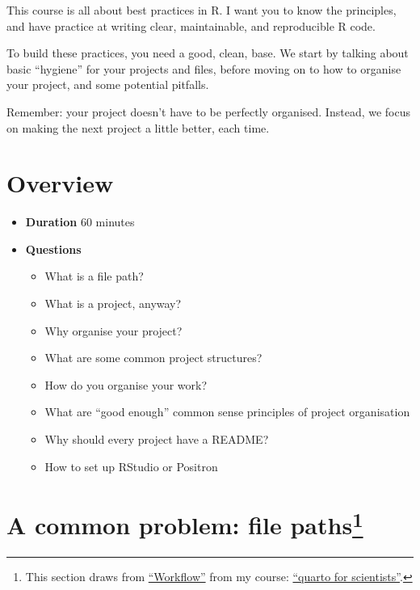 \documentclass[
  letterpaper,
  justified,
  a4paper]{tufte-book}
\providecommand{\tightlist}{%
  \setlength{\itemsep}{0pt}\setlength{\parskip}{0pt}}
\providecommand{\tightlist}{%
  \setlength{\itemsep}{0pt}\setlength{\parskip}{0pt}}
\begin{document}
This course is all about best practices in R. I want you to know the
principles, and have practice at writing clear, maintainable, and
reproducible R code.

To build these practices, you need a good, clean, base. We start by
talking about basic ``hygiene'' for your projects and files, before
moving on to how to organise your project, and some potential pitfalls.

Remember: your project doesn't have to be perfectly organised. Instead,
we focus on making the next project a little better, each time.


\chapter*{Overview}\label{overview}


\begin{itemize}
\tightlist
\item
  \textbf{Duration} 60 minutes
\end{itemize}

\begin{itemize}
\tightlist
\item
  \textbf{Questions}

  \begin{itemize}
  \tightlist
  \item
    What is a file path?
  \item
    What is a project, anyway?
  \item
    Why organise your project?
  \item
    What are some common project structures?
  \item
    How do you organise your work?
  \item
    What are ``good enough'' common sense principles of project
    organisation
  \item
    Why should every project have a README?
  \item
    How to set up RStudio or Positron
  \end{itemize}
\end{itemize}


\chapter[A common problem: file paths]{\texorpdfstring{A common problem:
file
paths\footnote{This section draws from
  \href{https://qmd4sci.njtierney.com/workflow.html}{``Workflow''} from
  my course: \href{https://qmd4sci.njtierney.com}{``quarto for
  scientists''}.}}{A common problem: file paths}}\label{a-common-problem-file-paths}
\end{document}
